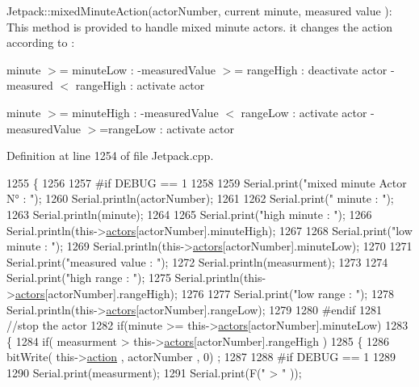 Jetpack\+::mixed\+Minute\+Action(actor\+Number, current minute, measured value )\+: This method is provided to handle mixed minute actors. it changes the action according to \+:

minute $>$= minute\+Low \+: -\/measured\+Value $>$= range\+High \+: deactivate actor -\/measured $<$ range\+High \+: activate actor

minute $>$= minute\+High \+: -\/measured\+Value $<$ range\+Low \+: activate actor -\/measured\+Value $>$=range\+Low \+: activate actor 

Definition at line 1254 of file Jetpack.\+cpp.


\begin{DoxyCode}
1255 \{
1256 
1257 \textcolor{preprocessor}{#if DEBUG == 1}
1258     
1259     Serial.print(\textcolor{stringliteral}{"mixed minute Actor N° : "});
1260     Serial.println(actorNumber);
1261 
1262     Serial.print(\textcolor{stringliteral}{" minute : "});
1263     Serial.println(minute);
1264 
1265     Serial.print(\textcolor{stringliteral}{"high minute : "});
1266     Serial.println(this->\hyperlink{class_jetpack_a7e16d2f97837f9712a2e6de1c50d99db}{actors}[actorNumber].minuteHigh);
1267 
1268     Serial.print(\textcolor{stringliteral}{"low minute : "});
1269     Serial.println(this->\hyperlink{class_jetpack_a7e16d2f97837f9712a2e6de1c50d99db}{actors}[actorNumber].minuteLow);
1270 
1271     Serial.print(\textcolor{stringliteral}{"measured value : "});
1272     Serial.println(measurment);
1273 
1274     Serial.print(\textcolor{stringliteral}{"high range : "});
1275     Serial.println(this->\hyperlink{class_jetpack_a7e16d2f97837f9712a2e6de1c50d99db}{actors}[actorNumber].rangeHigh);
1276 
1277     Serial.print(\textcolor{stringliteral}{"low range : "});
1278     Serial.println(this->\hyperlink{class_jetpack_a7e16d2f97837f9712a2e6de1c50d99db}{actors}[actorNumber].rangeLow);
1279 
1280 \textcolor{preprocessor}{#endif}
1281     \textcolor{comment}{//stop the actor    }
1282     \textcolor{keywordflow}{if}(minute >= this->\hyperlink{class_jetpack_a7e16d2f97837f9712a2e6de1c50d99db}{actors}[actorNumber].minuteLow)
1283     \{
1284             \textcolor{keywordflow}{if}( measurment > this->\hyperlink{class_jetpack_a7e16d2f97837f9712a2e6de1c50d99db}{actors}[actorNumber].rangeHigh )
1285             \{
1286                 bitWrite( this->\hyperlink{class_jetpack_aca3142925a7b0834b34ae91d26af7765}{action} , actorNumber , 0) ;
1287 
1288 \textcolor{preprocessor}{            #if DEBUG == 1 }
1289 
1290                 Serial.print(measurment);
1291                 Serial.print(F(\textcolor{stringliteral}{" > "} ));

\end{DoxyCode}
